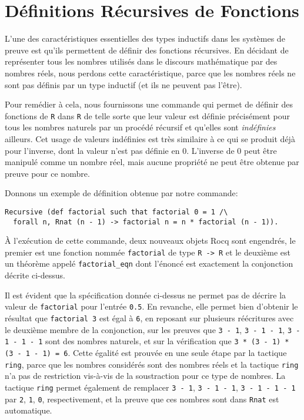 \documentclass{jflart}
\begin{document}
\section{Définitions Récursives de Fonctions}
L'une des caractéristiques essentielles des types inductifs dans les
systèmes de preuve est qu'ils permettent de définir des fonctions
récursives.  En décidant de représenter tous les nombres utilisés dans
le discours mathématique par des nombres réels, nous perdons cette
caractéristique, parce que les nombres réels ne sont pas définis par
un type inductif (et ils ne peuvent pas l'être).

Pour remédier à cela, nous fournissons une commande qui permet de
définir des fonctions de \texttt{R} dans \texttt{R} de telle sorte que leur
valeur est définie précisément pour tous les nombres naturels par un
procédé récursif et qu'elles sont {\em indéfinies} ailleurs.  Cet usage
de valeurs
indéfinies est très similaire à ce qui se produit déjà pour l'inverse, dont
la valeur n'est pas définie en 0.  
L'inverse de 0 peut être manipulé comme un nombre réel, mais aucune
propriété ne peut être obtenue par preuve pour ce nombre.

Donnons un exemple de définition obtenue par notre commande:
\begin{verbatim}
Recursive (def factorial such that factorial 0 = 1 /\
  forall n, Rnat (n - 1) -> factorial n = n * factorial (n - 1)).
\end{verbatim}
À l'exécution de cette commande, deux nouveaux objets Rocq sont
engendrés, le premier est une fonction nommée \texttt{factorial} de
type \texttt{R -> R} et le
deuxième est un théorème appelé \texttt{factorial\_eqn} dont l'énoncé
est exactement la conjonction décrite ci-dessus.

Il est évident que la spécification donnée ci-dessus ne permet pas de
décrire la valeur de \texttt{factorial} pour l'entrée \texttt{0.5}.
En revanche, elle permet bien d'obtenir le résultat que
\texttt{factorial 3} est égal à \texttt{6}, en reposant sur plusieurs
réécritures avec le deuxième membre de la conjonction, sur les preuves que
\texttt{3 - 1}, \texttt{3 - 1 - 1}, \texttt{3 - 1 - 1 - 1} sont des
nombres naturels, et sur la vérification que \texttt{3 * (3 - 1) * (3 -
  1 - 1) = 6}.  Cette égalité est prouvée en une
seule étape par la tactique \texttt{ring}, parce que les nombres
considérés sont des nombres réels et la tactique \texttt{ring} n'a pas de
restriction vis-à-vis de la soustraction pour ce type de nombres.  La
tactique \texttt{ring} permet également de remplacer
\texttt{3 - 1}, \texttt{3 - 1 - 1}, \texttt{3 - 1 - 1 - 1} par
\texttt{2}, \texttt{1}, \texttt{0},
respectivement, et la preuve que ces nombres sont dans \texttt{Rnat} est
automatique.
\end{document}
